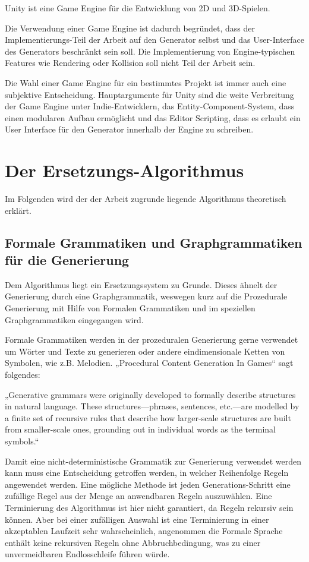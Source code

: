 Unity ist eine Game Engine für die Entwicklung von 2D und 3D-Spielen. 

Die Verwendung einer Game Engine ist dadurch begründet, dass der Implementierungs-Teil der Arbeit auf den Generator selbst und das User-Interface des Generators beschränkt sein soll. Die Implementierung von Engine-typischen Features wie Rendering oder Kollision soll nicht Teil der Arbeit sein.

Die Wahl einer Game Engine für ein bestimmtes Projekt ist immer auch eine subjektive Entscheidung. Hauptargumente für Unity sind die weite Verbreitung der Game Engine unter Indie-Entwicklern, das Entity-Component-System, dass einen modularen Aufbau ermöglicht und das Editor Scripting, dass es erlaubt ein User Interface für den Generator innerhalb der Engine zu schreiben. 

\chapter{Der Ersetzungs-Algorithmus}

Im Folgenden wird der der Arbeit zugrunde liegende Algorithmus theoretisch erklärt.

\section{Formale Grammatiken und Graphgrammatiken für die Generierung}

Dem Algorithmus liegt ein Ersetzungssystem zu Grunde. Dieses ähnelt der Generierung durch eine Graphgrammatik, weswegen kurz auf die Prozedurale Generierung mit Hilfe von Formalen Grammatiken und im speziellen Graphgrammatiken eingegangen wird.

Formale Grammatiken werden in der prozeduralen Generierung gerne verwendet um Wörter und Texte zu generieren oder andere eindimensionale Ketten von Symbolen, wie z.B. Melodien. „Procedural Content Generation In Games“ sagt folgendes:

„Generative grammars were originally developed to formally describe structures in natural language. These structures—phrases, sentences, etc.—are modelled by a finite set of recursive rules that describe how larger-scale structures are built from smaller-scale ones, grounding out in individual words as the terminal symbols.“
\cite[Kap.~3.5, S.~45]{shaker2016procedural}

Damit eine nicht-deterministische Grammatik zur Generierung verwendet werden kann muss eine Entscheidung getroffen werden, in welcher Reihenfolge Regeln angewendet werden. Eine mögliche Methode ist jeden Generations-Schritt eine zufällige Regel aus der Menge an anwendbaren Regeln auszuwählen. 
\cite[Kap.~5.2, S.~75]{shaker2016procedural}
Eine Terminierung des Algorithmus ist hier nicht garantiert, da Regeln rekursiv sein können. Aber bei einer zufälligen Auswahl ist eine Terminierung in einer akzeptablen Laufzeit sehr wahrscheinlich, angenommen die Formale Sprache enthält keine rekursiven Regeln ohne Abbruchbedingung, was zu einer unvermeidbaren Endlosschleife führen würde.

